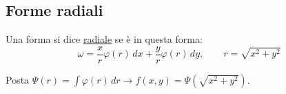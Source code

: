 \subsection{Forme radiali}

\begin{definition}
Una forma si dice \underline{radiale} se è in questa forma:
\[
\omega = \frac{x}{r} \varphi(r)\, dx + \frac{y}{r} \varphi(r)\, dy, \qquad r = \sqrt{x^2 + y^2}
\]

Posta $\Psi(r) = \displaystyle\int \varphi(r)\, dr \to f(x, y) = \Psi\left(\sqrt{x^2 + y^2}\right)$.
\end{definition}

